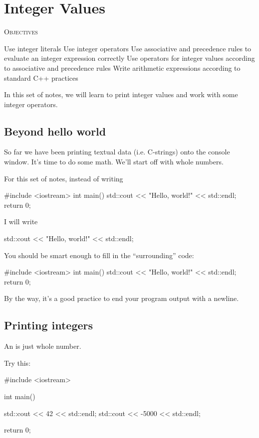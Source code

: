 \chapter{Integer Values}


\textsc{Objectives}
\begin{tightlist}
\li Use integer literals
\li Use integer operators
\li Use associative and precedence rules to evaluate an integer
expression correctly
\li Use operators for integer values according to associative and
precedence rules
\li Write arithmetic expressions according to standard C++
practices
\end{tightlist}

In this set of notes, we will learn to print integer values and work with
some integer operators.

\newpage\section{Beyond hello world}

So far we have been printing textual data (i.e. C-strings) onto the console
window. It's time to do some math. We'll start off with whole numbers.


For this set of notes, instead of writing

\begin{console}
#include <iostream>
int main()
{
    std::cout << "Hello, world!" << std::endl;
    return 0;
}
\end{console}

I will write
\begin{console}
std::cout << "Hello, world!" << std::endl;
\end{console}

You should be smart enough to fill in the “surrounding” code:
\begin{console}
#include <iostream>
int main()
{
    std::cout << "Hello, world!" << std::endl;
    return 0;
}
\end{console}

By the way, it's a good practice to end your program output with a
newline.

\newpage\section{Printing integers}

An  is just whole number.

Try this:
\begin{console}
#include <iostream>
  
int main()
{
    std::cout << 42 << std::endl;
    std::cout << -5000 << std::endl;
    
    return 0;
}
\end{console}

